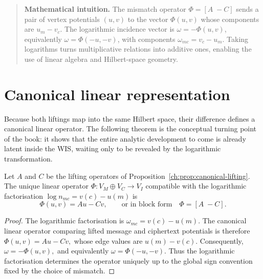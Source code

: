 \begin{quote}
\textbf{Mathematical intuition.}
The mismatch operator $\Phi=[A\; -C]$ sends a pair of vertex potentials $(u,v)$ to the vector $\Phi(u,v)$ whose components are $u_m-v_c$.  The logarithmic incidence vector is $\omega=-\Phi(u,v)$, equivalently $\omega=\Phi(-u,-v)$, with components $\omega_{mc}=v_c-u_m$.
Taking logarithms turns multiplicative relations into additive ones, enabling the use of linear algebra and Hilbert-space geometry.
\end{quote}

\section{Canonical linear representation}\label{ch:sec:canonical-linear-representation}
Because both liftings map into the same Hilbert space, their
difference defines a canonical linear operator.  The following theorem
is the conceptual turning point of the book: it shows that the entire
analytic development to come is already latent inside the WIS, waiting
only to be revealed by the logarithmic transformation.
\begin{theorem}\label{ch:thm:mismatch}
Let $A$ and $C$ be the lifting operators of
Proposition~\ref{ch:prop:canonical-lifting}.  The unique linear operator
$\Phi:V_M\oplus V_C\to V_I$ compatible with the logarithmic
factorisation $\log n_{mc}=v(c)-u(m)$ is
\[
\Phi(u,v)=Au-Cv,
\qquad\text{or in block form}\quad
\Phi=[A\;-C].
\]
\end{theorem}
\begin{proof}
The logarithmic factorisation is $\omega_{mc}=v(c)-u(m)$.
The canonical linear operator comparing lifted message and ciphertext
potentials is therefore $\Phi(u,v)=Au-Cv,$ whose edge values are $u(m)-v(c)$.
Consequently, $\omega = -\Phi(u,v),$ and equivalently $\omega=\Phi(-u,-v)$.
Thus the logarithmic factorisation determines the operator uniquely
up to the global sign convention fixed by the choice of mismatch.
\end{proof}

